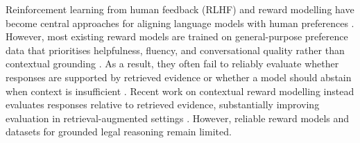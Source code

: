 \documentclass{article}
\theoremstyle{plain}
\theoremstyle{definition}
\theoremstyle{remark}
\begin{document}
Reinforcement learning from human feedback (RLHF) and reward modelling have become central approaches for aligning language models with human preferences \citep{Ouyang2022_rlhf,rafailov2023direct,bai2022constitutional}. However, most existing reward models are trained on general-purpose preference data that prioritises helpfulness, fluency, and conversational quality rather than contextual grounding \citep{wang2024helpsteer,lambert-etal-2025-rewardbench}. As a result, they often fail to reliably evaluate whether responses are supported by retrieved evidence or whether a model should abstain when context is insufficient \citep{xu-etal-2025-context}. Recent work on contextual reward modelling instead evaluates responses relative to retrieved evidence, substantially improving evaluation in retrieval-augmented settings \citep{xu-etal-2025-context, coman-etal-2025-ragferee}. However, reliable reward models and datasets for grounded legal reasoning remain limited.
\end{document}
